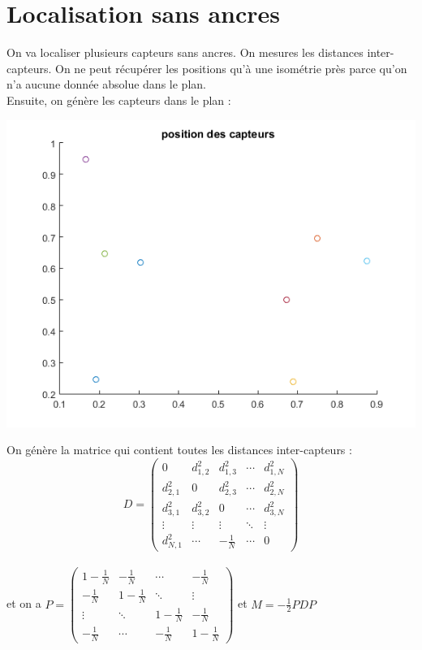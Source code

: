 \documentclass{article}
\begin{document}
\section{Localisation sans ancres}
On va localiser plusieurs capteurs sans ancres. On mesures les distances inter-capteurs. On ne peut r\'ecup\'erer les positions qu'\`a une isom\'etrie pr\`es parce qu'on n'a aucune donn\'ee absolue dans le plan. 
\\Ensuite, on g\'en\`ere les capteurs dans le plan :
\begin{center}
\includegraphics[scale=0.5]{sans_ancres1.png}
\end{center}
On g\'en\`ere la matrice qui contient toutes les distances inter-capteurs :
\[
D = \begin{pmatrix}
			0 & d^{2}_{1,2} & d^{2}_{1,3} & \cdots & d^{2}_{1,N} \\
      d^{2}_{2,1} & 0 & d^{2}_{2,3} & \cdots & d^{2}_{2,N} \\
		  d^{2}_{3,1} & d^{2}_{3,2} & 0 & \cdots & d^{2}_{3,N} \\
			\vdots & \vdots & \vdots & \ddots & \vdots \\
			d^{2}_{N,1} & \cdots & -\frac{1}{N} & \cdots & 0
	  \end{pmatrix}
\]
\\et on a $P = \begin{pmatrix}
								1-\frac{1}{N} & -\frac{1}{N} & \cdots & -\frac{1}{N} \\
								-\frac{1}{N} & 1-\frac{1}{N} & \ddots & \vdots\\
								\vdots & \ddots & 1-\frac{1}{N} & -\frac{1}{N} \\
								-\frac{1}{N} & \cdots & -\frac{1}{N} & 1-\frac{1}{N}
						 \end{pmatrix}$ et $M = -\frac{1}{2}PDP$
\end{document}
